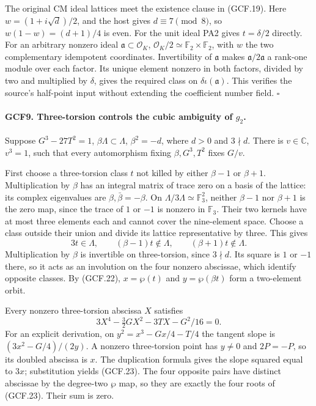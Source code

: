 \documentclass[11pt,a4paper]{article}
\numberwithin{equation}{section}
\theoremstyle{remark}\newtheorem{remark}[theorem]{Remark}
\begin{document}
The original CM ideal lattices meet the existence clause in (GCF.19).
Here \(w=(1+i\sqrt d)/2\), and the host gives
\(d\equiv7\pmod8\), so \(w(1-w)=(d+1)/4\) is even.
For the unit ideal PA2 gives \(t=\delta/2\) directly.
For an arbitrary nonzero ideal \(\mathfrak a\subset\mathcal O_K\),
\(\mathcal O_K/2\simeq\mathbb F_2\times\mathbb F_2\), with
\(w\) the two complementary idempotent coordinates.  Invertibility
of \(\mathfrak a\) makes \(\mathfrak a/2\mathfrak a\) a
rank-one module over each factor.  Its unique element nonzero in
both factors, divided by two and multiplied by \(\delta\), gives
the required class on \(\delta\iota(\mathfrak a)\).
This verifies the source's half-point input without extending the
coefficient number field.
\hfill\(\square\)

\paragraph{GCF9. Three-torsion controls the cubic ambiguity of \(g_2\).}
\label{claim:GCF9}
Suppose \(G^3-27T^2=1\), \(\beta\Lambda\subset\Lambda\),
\(\beta^2=-d\), where \(d>0\) and \(3\nmid d\).
There is \(v\in\mathbb C\), \(v^3=1\), such that every
automorphism fixing \(\beta,G^3,T^2\) fixes \(G/v\).

First choose a three-torsion class \(t\) not killed by either
\(\beta-1\) or \(\beta+1\).  Multiplication by \(\beta\)
has an integral matrix of trace zero on a basis of the lattice:
its complex eigenvalues are \(\beta,\bar\beta=-\beta\).
On \(\Lambda/3\Lambda\simeq\mathbb F_3^2\), neither
\(\beta-1\) nor \(\beta+1\) is the zero map, since the
trace of \(1\) or \(-1\) is nonzero in \(\mathbb F_3\).
Their two kernels have at most three elements each and cannot cover
the nine-element space.  Choose a class outside their union and
divide its lattice representative by three.  This gives
\[
 3t\in\Lambda,\qquad(\beta-1)t\notin\Lambda,\qquad
                              (\beta+1)t\notin\Lambda.          \tag{GCF.22}
\]
Multiplication by \(\beta\) is invertible on three-torsion, since
\(3\nmid d\).  Its square is \(1\) or \(-1\) there, so it
acts as an involution on the four nonzero abscissae, which identify
opposite classes.  By (GCF.22),
\(x=\wp(t)\) and \(y=\wp(\beta t)\) form a two-element orbit.

Every nonzero three-torsion abscissa \(X\) satisfies
\[
 3X^4-\tfrac32GX^2-3TX-G^2/16=0.                    \tag{GCF.23}
\]
For an explicit derivation, on \(y^2=x^3-Gx/4-T/4\) the tangent
slope is \((3x^2-G/4)/(2y)\).  A nonzero three-torsion point has
\(y\ne0\) and \(2P=-P\), so its doubled abscissa is \(x\).
The duplication formula gives the slope squared equal to \(3x\);
substitution yields (GCF.23).  The four opposite pairs have distinct
abscissae by the degree-two \(\wp\) map, so they are exactly the
four roots of (GCF.23).  Their sum is zero.
\end{document}
